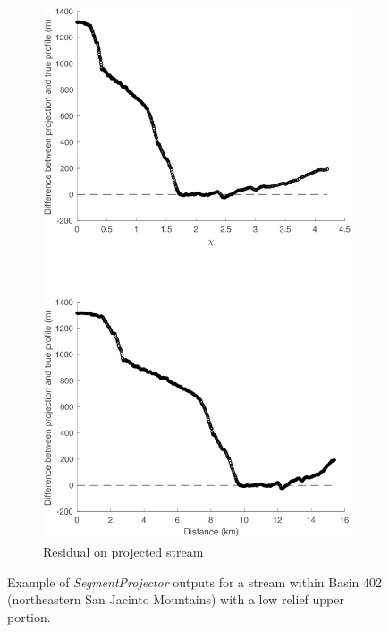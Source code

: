 \begin{figure}[H]
	\begin{subfigure}{.5\textwidth}
		\centering
		\includegraphics[width=.8\linewidth]{PNGs/B402_ProjResidual_1.png}
		\caption{Residual on projected stream}
		\label{fig:p1sub2}
	\end{subfigure}
	\caption{Example of \textit{SegmentProjector} outputs for a stream within Basin 402 (northeastern San Jacinto Mountains) with a low relief upper portion.}
	\label{fig:proj1}
\end{figure}

